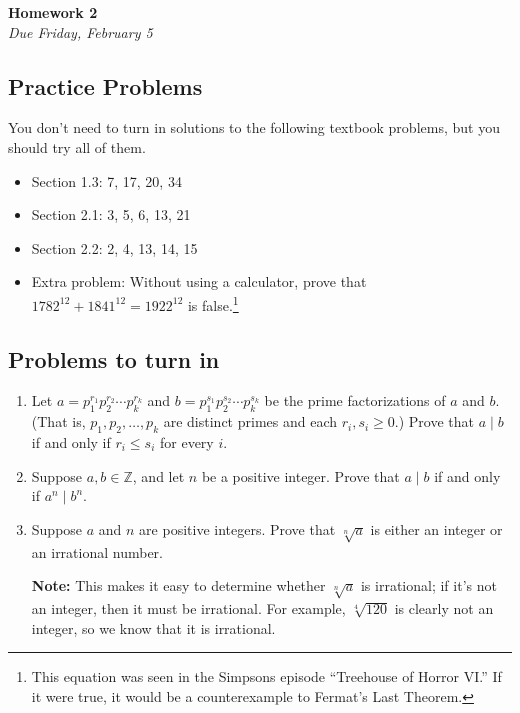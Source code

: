 \documentclass[12pt,reqno]{article}
\newcommand{\Z}{\mathbb{Z}}
\begin{document}
\begin{center}
\textbf{Homework 2} \\
\textit{Due Friday, February 5}
\end{center}



\subsection*{Practice Problems}

You don't need to turn in solutions to the following textbook problems, but you should try all of them. 

\begin{itemize}
\item Section 1.3: 7, 17, 20, 34
\item Section 2.1: 3, 5, 6, 13, 21
\item Section 2.2: 2, 4, 13, 14, 15
\item Extra problem: Without using a calculator, prove that $1782^{12} + 1841^{12} = 1922^{12}$ is false.\footnote{This equation was seen in the Simpsons episode ``Treehouse of Horror VI.'' If it were true, it would be a counterexample to Fermat's Last Theorem.}
\end{itemize}

\subsection*{Problems to turn in}

\begin{enumerate}
\item Let $a = p_1^{r_1} p_2^{r_2} \dotsb p_k^{r_k}$ and $b = p_1^{s_1} p_2^{s_2} \dotsb p_k^{s_k}$ be the prime factorizations of $a$ and $b$. (That is, $p_1, p_2, \dotsc, p_k$ are distinct primes and each $r_i, s_i \geq 0$.) Prove that $a \mid b$ if and only if $r_i \leq s_i$ for every $i$.


\item Suppose $a, b \in \Z$, and let $n$ be a positive integer. Prove that $a \mid b$ if and only if $a^n \mid b^n$.


\item Suppose $a$ and $n$ are positive integers. Prove that $\sqrt[n]{a}$ is either an integer or an irrational number.

\textbf{Note:} This makes it easy to determine whether $\sqrt[n]{a}$ is irrational; if it's not an integer, then it must be irrational. For example, $\sqrt[4]{120}$ is clearly not an integer, so we know that it is irrational.



\end{enumerate}
\end{document}
